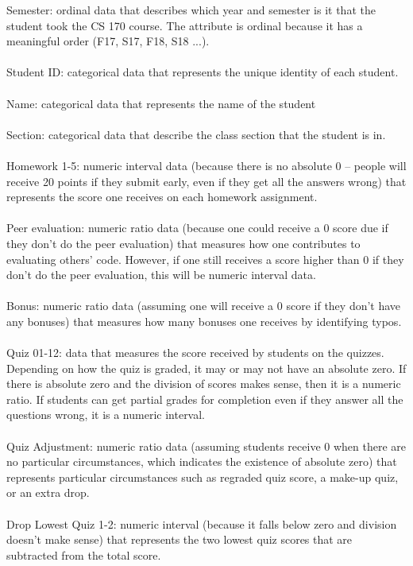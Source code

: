\documentclass[9pt,twoside]{exam}
\begin{document}
Semester: ordinal data that describes which year and semester is it that the student took the CS 170 course. The attribute is ordinal because it has a meaningful order (F17, S17, F18, S18 ...).
\\\\
Student ID: categorical data that represents the unique identity of each student.
\\\\
Name: categorical data that represents the name of the student
\\\\
Section: categorical data that describe the class section that the student is in.
\\\\
Homework 1-5: numeric interval data (because there is no absolute 0 -- people will receive 20 points if they submit early, even if they get all the answers wrong) that represents the score one receives on each homework assignment.
\\\\
Peer evaluation: numeric ratio data (because one could receive a 0 score due if they don't do the peer evaluation) that measures how one contributes to evaluating others' code. However, if one still receives a score higher than 0 if they don't do the peer evaluation, this will be numeric interval data.
\\\\
Bonus: numeric ratio data (assuming one will receive a 0 score if they don't have any bonuses) that measures how many bonuses one receives by identifying typos.  
\\\\
Quiz 01-12: data that measures the score received by students on the quizzes. Depending on how the quiz is graded, it may or may not have an absolute zero. If there is absolute zero and the division of scores makes sense, then it is a numeric ratio. If students can get partial grades for completion even if they answer all the questions wrong, it is a numeric interval.
\\\\
Quiz Adjustment: numeric ratio data (assuming students receive 0 when there are no particular circumstances, which indicates the existence of absolute zero) that represents particular circumstances such as regraded quiz score, a make-up quiz, or an extra drop.
\\\\
Drop Lowest Quiz 1-2: numeric interval (because it falls below zero and division doesn't make sense) that represents the two lowest quiz scores that are subtracted from the total score.
\end{document}
